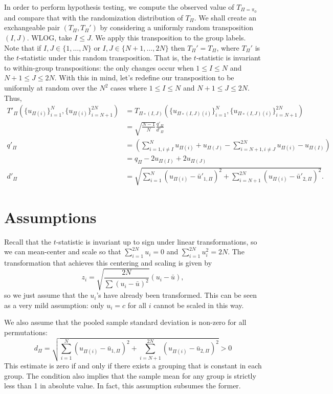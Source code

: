 In order to perform hypothesis testing, we compute the observed value of $T_{\Pi=\pi_0}$ and compare
that with the randomization distribution of $T_{\Pi}$.  We shall create an exchangeable pair
$(T_{\Pi}, T_{\Pi}')$ by considering a uniformly random transposition $(I, J)$.  WLOG, take $I \leq
J$.  We apply this transposition to the group labels.  Note that if $I, J \in \{1,\ldots,N\}$ or $I,
J \in \{N+1,\ldots,2N\}$ then $T_{\Pi}' = T_{\Pi}$, where $T_{\Pi}'$ is the $t$-statistic under this
random transposition.  That is, the $t$-statistic is invariant to within-group transpositions: the
only changes occur when $1 \leq I \leq N$ and $N + 1 \leq J \leq 2N$.  With this in mind, let's
redefine our transposition to be uniformly at random over the $N^2$ cases where $1 \leq I \leq N$
and $N + 1 \leq J \leq 2N$. Thus,
\begin{align*}
  T'_{\Pi}(\{u_{\Pi(i)}\}_{i=1}^N, \{u_{\Pi(i)}\}_{i=N+1}^{2N}) 
  &= T_{\Pi \circ (I,J)}(\{u_{\Pi \circ (I,J)(i)}\}_{i=1}^N, \{u_{\Pi \circ (I,J)(i)}\}_{i=N+1}^{2N}) \\
  &= \sqrt{\frac{N-1}{N}}\frac{q'_{\Pi}}{d'_{\Pi}} \\
  q'_{\Pi} &= \left (\sum_{i=1, i\neq I}^N u_{\Pi(i)} + u_{\Pi(J)} -
    \sum_{i=N+1, i\neq J}^{2N}u_{\Pi(i)} - u_{\Pi(I)} \right ) \\
  &= q_{\Pi} - 2u_{\Pi(I)} + 2u_{\Pi(J)} \\
  d'_{\Pi} &= \sqrt{\sum_{i=1}^N(u_{\Pi(i)} - \bar{u}'_{1, \Pi})^{2} +
    \sum_{i=N+1}^{2N}(u_{\Pi(i)} - \bar{u}'_{2, \Pi})^{2}}.  
\end{align*}

\section{Assumptions}
Recall that the $t$-statistic is invariant up to sign under linear transformations, so we can
mean-center and scale so that $\sum_{i=1}^{2N} u_{i} = 0$ and $\sum_{i=1}^{2N} u_{i}^2 = 2N$.  The
transformation that achieves this centering and scaling is given by
\begin{equation}
  z_i = \sqrt{\frac{2N}{\sum (u_{i} - \bar{u})^2}}(u_{i}-\bar{u}), 
\end{equation}
so we just assume that the $u_{i}$'s have already been transformed.  This can be seen as a very mild
assumption: only $u_i = c$ for all $i$ cannot be scaled in this way.

We also assume that the pooled sample standard deviation is non-zero for all permutations:
\begin{equation}
  \label{A:non-zero-std-dev}
  d_\Pi = \sqrt{\sum_{i=1}^N(u_{\Pi(i)} - \bar{u}_{1,\Pi})^2 + \sum_{i=N+1}^{2N}(u_{\Pi(i)} -
    \bar{u}_{2,\Pi})^2} > 0
\end{equation}
This estimate is zero if and only if there exists a grouping that is constant in each group.  The
condition also implies that the sample mean for any group is strictly less than 1 in absolute
value.  In fact, this assumption subsumes the former.

